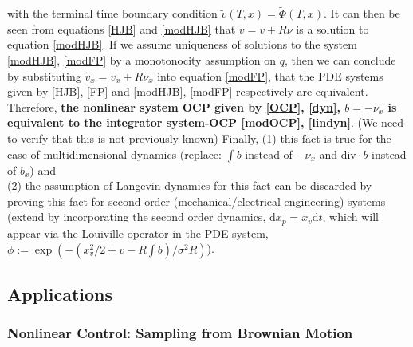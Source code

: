 \documentclass[letterpaper, 12pt]{article}
\newcommand{\rd}{{\mathrm d}}
\begin{document}
with the terminal time boundary condition $\tilde{v}(T,x) = \tilde{\Phi}(T,x)$. It can then be seen from equations \eqref{HJB} and \eqref{modHJB} that $\tilde{v} = v + R \nu$ is a solution to equation \eqref{modHJB}. If we assume uniqueness of solutions to the system \eqref{modHJB}, \eqref{modFP} by a monotonocity assumption on $\tilde{q}$, then we can conclude by substituting $\tilde{v}_x = v_x + R\nu_x$ into equation \eqref{modFP}, that the PDE systems given by \eqref{HJB}, \eqref{FP} and \eqref{modHJB}, \eqref{modFP} respectively are equivalent. Therefore, \textbf{the nonlinear system OCP given by \eqref{OCP}, \eqref{dyn}, $b = -\nu_x$ is equivalent to the integrator system-OCP \eqref{modOCP}, \eqref{lindyn}}. {\color{blue} (We need to verify that this is not previously known)} Finally, (1) this fact is true for the case of multidimensional dynamics (replace: $\int b$ instead of $-\nu_x$ and $\text{div} \cdot b$ instead of $b_x$) and \\
(2) the assumption of Langevin dynamics for this fact can be discarded by proving this fact for second order (mechanical/electrical engineering) systems (extend by incorporating the second order dynamics, $\rd x_p = x_v \rd t$, which will appear via the Louiville operator in the PDE system, $\tilde{\phi} := \exp(-(x_v^2/2 + v - R\int b)/\sigma^2 R)$).

\subsection{Applications}
 
\subsubsection{Nonlinear Control: Sampling from Brownian Motion}
\end{document}
